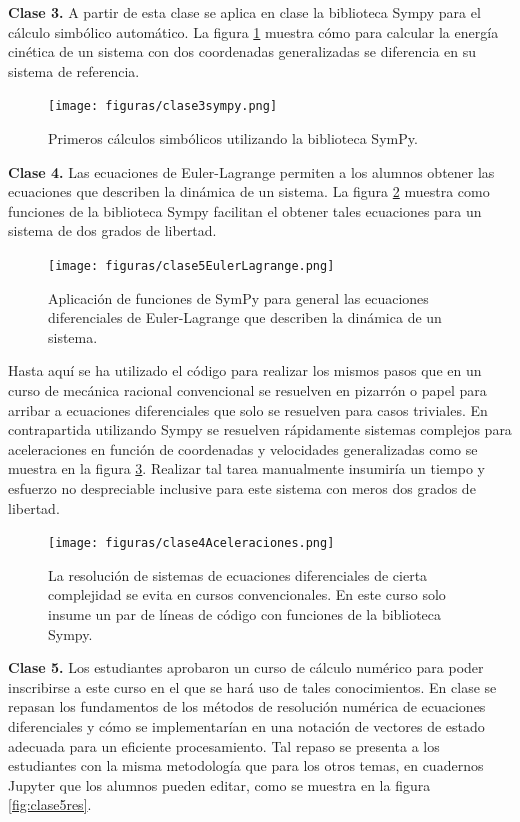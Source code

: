 \textbf{Clase 3.} A partir de esta clase se aplica en clase la biblioteca Sympy para el cálculo simbólico automático. La figura \ref{fig:clase3sympy} muestra cómo para calcular la energía cinética de un sistema con dos coordenadas generalizadas se diferencia en su sistema de referencia.

\begin{figure}[!ht]
\centering
\texttt{[image: figuras/clase3sympy.png]}
\caption{Primeros cálculos simbólicos utilizando la biblioteca SymPy.}
\label{fig:clase3sympy}
\end{figure}

\textbf{Clase 4.} Las ecuaciones de Euler-Lagrange permiten a los alumnos obtener las ecuaciones que describen la dinámica de un sistema. La figura \ref{fig:clase4euler} muestra como funciones de la biblioteca Sympy facilitan el obtener tales ecuaciones para un sistema de dos grados de libertad.

\begin{figure}[!ht]
\centering
\texttt{[image: figuras/clase5EulerLagrange.png]}
\caption{Aplicación de funciones de SymPy para general las ecuaciones diferenciales de Euler-Lagrange que describen la dinámica de un sistema.}
\label{fig:clase4euler}
\end{figure}

Hasta aquí se ha utilizado el código para realizar los mismos pasos que en un curso de mecánica racional convencional se resuelven en pizarrón o papel para arribar a ecuaciones diferenciales que solo se resuelven para casos triviales. En contrapartida utilizando Sympy se resuelven rápidamente sistemas complejos para aceleraciones en función de coordenadas y velocidades generalizadas como se muestra en la figura \ref{fig:clase4ac}. Realizar tal tarea manualmente insumiría un tiempo y esfuerzo no despreciable inclusive para este sistema con meros dos grados de libertad.

\begin{figure}[!ht]
\centering
\texttt{[image: figuras/clase4Aceleraciones.png]}
\caption{La resolución de sistemas de ecuaciones diferenciales de cierta complejidad se evita en cursos convencionales. En este curso solo insume un par de líneas de código con funciones de la biblioteca Sympy.}
\label{fig:clase4ac}
\end{figure}

\textbf{Clase 5.} Los estudiantes aprobaron un curso de cálculo numérico para poder inscribirse a este curso en el que se hará uso de tales conocimientos. En clase se repasan los fundamentos de los métodos de resolución numérica de ecuaciones diferenciales y cómo se implementarían en una notación de vectores de estado adecuada para un eficiente procesamiento. Tal repaso se presenta a los estudiantes con la misma metodología que para los otros temas, en cuadernos Jupyter que los alumnos pueden editar, como se muestra en la figura \ref{fig:clase5res}.  

